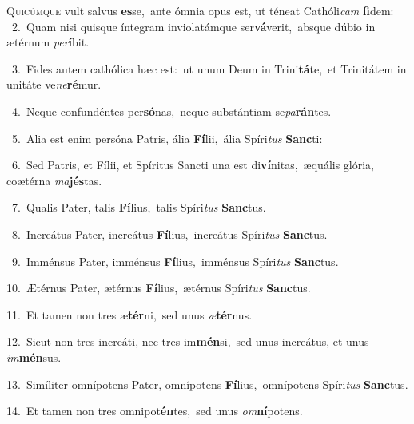 \lettrine{\initial\textcolor{\initialcolor}{Q}}{uicúmque} vult salvus \textbf{es}\-se,~\star ante ómnia opus est, ut téneat Cathóli\textit{cam} \textbf{fi}\-dem:\\
{\numbfont\textcolor{\numbcolor}{~2.}}~Quam nisi quisque íntegram inviolatámque ser\-\textbf{vá}\-verit,~\star absque dúbio in ætérnum \textit{per}\-\textbf{í}bit.\par
{\numbfont\textcolor{\numbcolor}{~3.}}~Fides autem cathólica hæc est:~\dagger ut unum Deum in Trini\-\textbf{tá}\-te,~\star et Trinitátem in unitáte ve\-\textit{ne}\-\textbf{ré}mur.\par
{\numbfont\textcolor{\numbcolor}{~4.}}~Neque confundéntes per\-\textbf{só}\-nas,~\star neque substántiam se\-\textit{pa}\-\textbf{rán}tes.\par
{\numbfont\textcolor{\numbcolor}{~5.}}~Alia est enim persóna Patris, ália \textbf{Fí}\-lii,~\star ália Spíri\textit{tus} \textbf{Sanc}\-ti:\par
{\numbfont\textcolor{\numbcolor}{~6.}}~Sed Patris, et Fílii, et Spíritus Sancti una est di\-\textbf{ví}\-nitas,~\star æquális glória, coætérna \textit{ma}\-\textbf{jés}tas.\par
{\numbfont\textcolor{\numbcolor}{~7.}}~Qualis Pater, talis \textbf{Fí}\-lius,~\star talis Spíri\textit{tus} \textbf{Sanc}\-tus.\par
{\numbfont\textcolor{\numbcolor}{~8.}}~Increátus Pater, increátus \textbf{Fí}\-lius,~\star increátus Spíri\textit{tus} \textbf{Sanc}\-tus.\par
{\numbfont\textcolor{\numbcolor}{~9.}}~Imménsus Pater, imménsus \textbf{Fí}\-lius,~\star imménsus Spíri\textit{tus} \textbf{Sanc}\-tus.\par
{\numbfont\textcolor{\numbcolor}{10.}}~Ætérnus Pater, ætérnus \textbf{Fí}\-lius,~\star ætérnus Spíri\textit{tus} \textbf{Sanc}\-tus.\par
{\numbfont\textcolor{\numbcolor}{11.}}~Et tamen non tres æ\-\textbf{tér}\-ni,~\star sed unus \textit{æ}\-\textbf{tér}nus.\par
{\numbfont\textcolor{\numbcolor}{12.}}~Sicut non tres increáti, nec tres im\-\textbf{mén}\-si,~\star sed unus increátus, et unus \textit{im}\-\textbf{mén}sus.\par
{\numbfont\textcolor{\numbcolor}{13.}}~Simíliter omnípotens Pater, omnípotens \textbf{Fí}\-lius,~\star omnípotens Spíri\textit{tus} \textbf{Sanc}\-tus.\par
{\numbfont\textcolor{\numbcolor}{14.}}~Et tamen non tres omnipot\-\textbf{én}\-tes,~\star sed unus \textit{om}\-\textbf{ní}potens.\par
